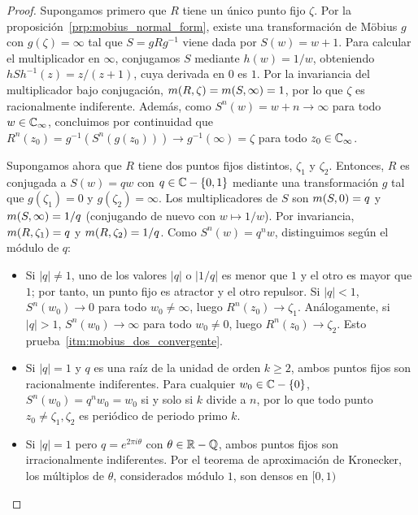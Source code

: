 \begin{proof}
  Supongamos primero que $R$ tiene un único punto fijo $\zeta$. Por la
  proposición~\ref{prp:mobius_normal_form}, existe una transformación de Möbius
  $g$ con $g(\zeta) = \infty$ tal que $S = g R g^{-1}$ viene dada por $S(w) = w
  + 1$. Para calcular el multiplicador en $\infty$, conjugamos $S$ mediante
  $h(w) = 1/w$, obteniendo $h S h^{-1}(z) = z/(z+1)$, cuya derivada en $0$ es
  $1$. Por la invariancia del multiplicador bajo conjugación,
  $m({R}, {\zeta}) = m({S}, {\infty}) = 1$, por lo que $\zeta$ es
  racionalmente indiferente. Además, como $S^n(w) = w + n \to \infty$ para todo
  $w \in \mathbb{C}_\infty$, concluimos por continuidad que $R^n(z_0) = g^{-1}(S^n(g(z_0)))
  \to g^{-1}(\infty) = \zeta$ para todo $z_0 \in \mathbb{C}_\infty$.

  Supongamos ahora que $R$ tiene dos puntos fijos distintos, $\zeta_1$ y
  $\zeta_2$. Entonces, $R$ es conjugada a $S(w) = qw$ con $q \in \mathbb{C} - \{0, 1\}$
  mediante una transformación $g$ tal que $g(\zeta_1) = 0$ y $g(\zeta_2) =
  \infty$. Los multiplicadores de $S$ son $m({S}, {0}) = q$ y
  $m({S}, {\infty}) = 1/q$ (conjugando de nuevo con $w \mapsto 1/w$). Por
  invariancia, $m({R}, {\zeta_1}) = q$ y $m({R}, {\zeta_2}) = 1/q$.
  Como $S^n(w) = q^n w$, distinguimos según el módulo de $q$:
  \begin{itemize}
    \item Si $|q| \neq 1$, uno de los valores $|q|$ o $|1/q|$ es menor que $1$
          y el otro es mayor que $1$; por tanto, un punto fijo es atractor y el
          otro repulsor. Si $|q| < 1$, $S^n(w_0) \to 0$ para todo $w_0 \neq
          \infty$, luego $R^n(z_0) \to \zeta_1$. Análogamente, si $|q| > 1$,
          $S^n(w_0) \to \infty$ para todo $w_0 \neq 0$, luego $R^n(z_0) \to
          \zeta_2$. Esto prueba~\ref{itm:mobius_dos_convergente}.
    \item Si $|q| = 1$ y $q$ es una raíz de la unidad de orden $k \geq 2$,
          ambos puntos fijos son racionalmente indiferentes. Para cualquier
          $w_0 \in \mathbb{C} - \{0\}$, $S^n(w_0) = q^n w_0 = w_0$ si y solo si $k$
          divide a $n$, por lo que todo punto $z_0 \neq \zeta_1, \zeta_2$ es
          periódico de periodo primo $k$.
    \item Si $|q| = 1$ pero $q = e^{2\pi i \theta}$ con $\theta \in \mathbb{R} - \mathbb{Q}$,
          ambos puntos fijos son irracionalmente indiferentes. Por el teorema
          de aproximación de Kronecker, los múltiplos de $\theta$, considerados
          módulo $1$, son densos en $[0,1)$

\end{itemize}
\end{proof}
